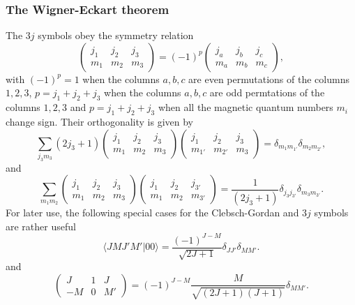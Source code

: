 \documentclass[compress]{beamer}
\begin{document}
\frame
{
\frametitle{The Wigner-Eckart theorem}
\begin{small}
{\scriptsize
The $3j$ symbols obey the symmetry relation
\[
\left(\begin{array}{ccc}  j_1 & j_2 & j_3 \\ m_1 & m_2 & m_3\end{array}\right)=(-1)^{p}\left(\begin{array}{ccc}  j_a & j_b & j_c \\ m_a & m_b & m_c\end{array}\right),
\]
with $(-1)^p=1$ when the columns $a,b, c$ are even permutations of the columns $1,2,3$, $p=j_1+j_2+j_3$ when the columns $a,b,c$ are odd permtations of the
columns $1,2,3$ and $p=j_1+j_2+j_3$ when all the magnetic quantum numbers $m_i$ change sign. Their orthogonality is given by
\[
\sum_{j_3m_3}(2j_3+1)\left(\begin{array}{ccc}  j_1 & j_2 & j_3 \\ m_1 & m_2 & m_3\end{array}\right)\left(\begin{array}{ccc}  j_1 & j_2 & j_3 \\ m_{1'} & m_{2'} & m_3\end{array}\right)=\delta_{m_1m_{1'}}\delta_{m_2m_{2'}},
\]
and 
\[
\sum_{m_1m_2}\left(\begin{array}{ccc}  j_1 & j_2 & j_3 \\ m_1 & m_2 & m_3\end{array}\right)\left(\begin{array}{ccc}  j_1 & j_2 & j_{3'} \\ m_{1} & m_{2} & m_{3'}\end{array}\right)=\frac{1}{(2j_3+1)}\delta_{j_3j_{3'}}\delta_{m_3m_{3'}}.
\]
For later use, the following special cases for the Clebsch-Gordan and $3j$ symbols are rather useful
\[
\langle JM J'M' |00\rangle =\frac{(-1)^{J-M}}{\sqrt{2J+1}}\delta_{JJ'}\delta_{MM'}.
\] 
and 
\[
\left(\begin{array}{ccc}  J & 1 & J \\ -M & 0 & M'\end{array}\right)=(-1)^{J-M}\frac{M}{\sqrt{(2J+1)(J+1)}}\delta_{MM'}.
\]
}
\end{small}

}
\end{document}
